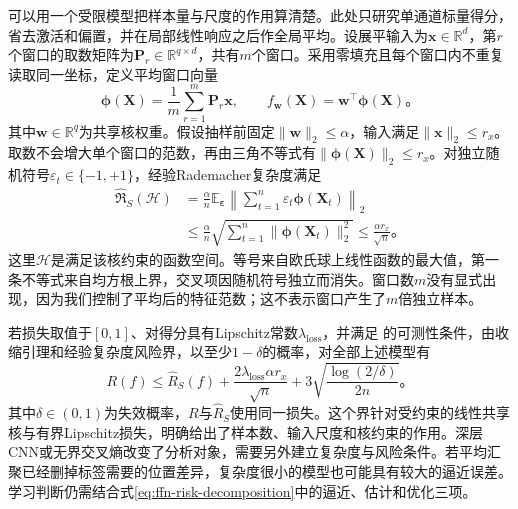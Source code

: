 可以用一个受限模型把样本量与尺度的作用算清楚。此处只研究单通道标量得分，省去激活和偏置，并在局部线性响应之后作全局平均。设展平输入为$\bm x\in\mathbb R^d$，第$r$个窗口的取数矩阵为$\bm P_r\in\mathbb R^{q\times d}$，共有$m$个窗口。采用零填充且每个窗口内不重复读取同一坐标，定义平均窗口向量
\begin{equation}
  \bm\phi(\bm X)=\frac1m\sum_{r=1}^{m}\bm P_r\bm x,
  \qquad f_{\bm w}(\bm X)=\bm w^\top\bm\phi(\bm X)\text{。}
  \label{eq:cnn-pooled-linear-model}
\end{equation}
其中$\bm w\in\mathbb R^q$为共享核权重。假设抽样前固定$\lVert\bm w\rVert_2\leq\alpha$，输入满足$\lVert\bm x\rVert_2\leq r_x$。取数不会增大单个窗口的范数，再由三角不等式有$\lVert\bm\phi(\bm X)\rVert_2\leq r_x$。对独立随机符号$\varepsilon_t\in\{-1,+1\}$，经验Rademacher复杂度满足
\begin{equation}
  \begin{aligned}
    \widehat{\mathfrak R}_S(\mathcal H)
    &=\frac\alpha n\mathbb E_{\bm\varepsilon}
           \left\lVert\sum_{t=1}^{n}\varepsilon_t\bm\phi(\bm X_t)\right\rVert_2\\
    &\leq\frac\alpha n
         \sqrt{\sum_{t=1}^{n}\lVert\bm\phi(\bm X_t)\rVert_2^2}
     \leq\frac{\alpha r_x}{\sqrt n}\text{。}
  \end{aligned}
  \label{eq:cnn-pooled-rademacher}
\end{equation}
这里$\mathcal H$是满足该核约束的函数空间。等号来自欧氏球上线性函数的最大值，第一条不等式来自均方根上界，交叉项因随机符号独立而消失。窗口数$m$没有显式出现，因为我们控制了平均后的特征范数；这不表示窗口产生了$m$倍独立样本。

若损失取值于$[0,1]$、对得分具有Lipschitz常数$\lambda_{\mathrm{loss}}$，并满足
的可测性条件，由收缩引理和经验复杂度风险界，以至少$1-\delta$的概率，对全部上述模型有
\begin{equation}
  R(f)\leq\widehat R_S(f)
    +\frac{2\lambda_{\mathrm{loss}}\alpha r_x}{\sqrt n}
    +3\sqrt{\frac{\log(2/\delta)}{2n}}\text{。}
  \label{eq:cnn-pooled-risk-bound}
\end{equation}
其中$\delta\in(0,1)$为失效概率，$R$与$\widehat R_S$使用同一损失。这个界针对受约束的线性共享核与有界Lipschitz损失，明确给出了样本数、输入尺度和核约束的作用。深层CNN或无界交叉熵改变了分析对象，需要另外建立复杂度与风险条件。若平均汇聚已经删掉标签需要的位置差异，复杂度很小的模型也可能具有较大的逼近误差。学习判断仍需结合式\eqref{eq:ffn-risk-decomposition}中的逼近、估计和优化三项。

